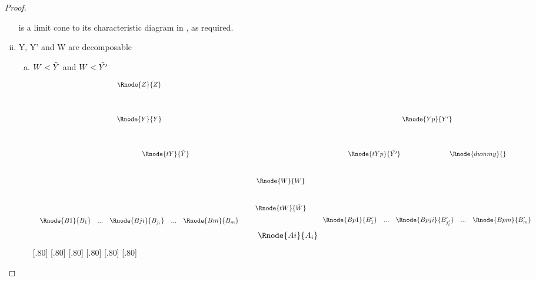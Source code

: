 \documentclass[10pt,a4paper]{scrartcl}
\begin{document}
\begin{proof}
\begin{enumerate}[(i)]
is a limit cone to its characteristic diagram in \ccat, 
as required.

\item{Y, Y' and W are decomposable}

\begin{enumerate} [(a)]
\item $W < \tilde{Y}$ and $W < \tilde{Y'}$
\begin{center}
\begin{displaymath}
\begin{array}{c c c c c}
  \Rnode{Z}{Z} & &              &                               &              \\ [1.4cm]
  \Rnode{Y}{Y} & &              &                               &\Rnode{Yp}{Y'}\\ [1.4cm]
	\hspace{2.8cm}\Rnode{tY}{\pbase{Y}}&&&&\Rnode{tYp}{\pbase{Y'}}\hspace{2.6cm}\Rnode{dummy}{}\\ [1.0cm]
	             & & \Rnode{W}{W} &                               &              \\ [1.0cm]
               & & \Rnode{tW}{\pbase{W}} &                      &              \\ [0.2cm]
	 \begin{array}{cp{0.3cm}c         p{0.3cm}  c}					
   \Rnode{B1}{B_1}&  ... & \Rnode{Bji}{B_{j_i}} & ... & \Rnode{Bm}{B_m}
	 \end{array} 
	 & & & &
	\begin{array}{c c c c c}					
   \Rnode{Bp1}{B'_1}& ... & \Rnode{Bpji}{B'_{j'_i}}&  ... & \Rnode{Bpm}{B'_m}
	 \end{array}                                                
\end{array} 
\end{displaymath}
\vspace{1.0cm}
\begin{displaymath}
\begin{array}{c c c c c}
 & &               &  & \Rnode{Ai}{A_i}    \\
\end{array}
\end{displaymath}
[.80]
[.80]
[.80]
[.80]
[.80]
[.80]

\end{center}
\end{enumerate}
\end{enumerate}
\end{proof}
\end{document}
